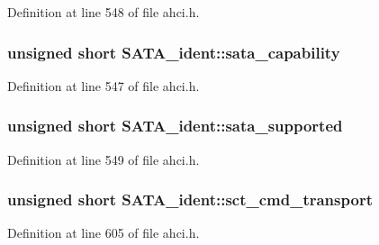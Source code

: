 Definition at line 548 of file ahci.\+h.

\subsubsection[{\texorpdfstring{sata\+\_\+capability}{sata_capability}}]{\setlength{\rightskip}{0pt plus 5cm}unsigned short S\+A\+T\+A\+\_\+ident\+::sata\+\_\+capability}\hypertarget{structSATA__ident_aa8bd934743b5ee069527b69a0b03d0a0}{}\label{structSATA__ident_aa8bd934743b5ee069527b69a0b03d0a0}


Definition at line 547 of file ahci.\+h.

\subsubsection[{\texorpdfstring{sata\+\_\+supported}{sata_supported}}]{\setlength{\rightskip}{0pt plus 5cm}unsigned short S\+A\+T\+A\+\_\+ident\+::sata\+\_\+supported}\hypertarget{structSATA__ident_abbd1fd98f82be0ce8e3278f63065f886}{}\label{structSATA__ident_abbd1fd98f82be0ce8e3278f63065f886}


Definition at line 549 of file ahci.\+h.

\subsubsection[{\texorpdfstring{sct\+\_\+cmd\+\_\+transport}{sct_cmd_transport}}]{\setlength{\rightskip}{0pt plus 5cm}unsigned short S\+A\+T\+A\+\_\+ident\+::sct\+\_\+cmd\+\_\+transport}\hypertarget{structSATA__ident_ae181871bbc156f78608cb240648b113a}{}\label{structSATA__ident_ae181871bbc156f78608cb240648b113a}


Definition at line 605 of file ahci.\+h.

